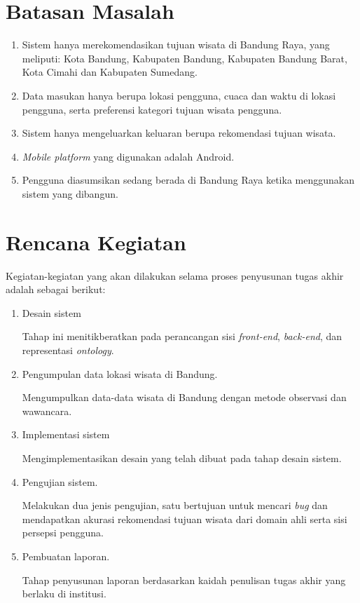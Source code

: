 \section{Batasan Masalah}
\begin{enumerate}
	\item Sistem hanya merekomendasikan tujuan wisata di Bandung Raya, yang meliputi: Kota Bandung, Kabupaten Bandung, Kabupaten Bandung Barat, Kota Cimahi dan Kabupaten Sumedang.
	\item Data masukan hanya berupa lokasi pengguna, cuaca  dan waktu di lokasi pengguna, serta preferensi kategori tujuan wisata pengguna.
	\item Sistem hanya mengeluarkan keluaran berupa rekomendasi tujuan wisata.
	\item \textit{Mobile platform} yang digunakan adalah Android.
	\item Pengguna diasumsikan sedang berada di Bandung Raya ketika menggunakan sistem yang dibangun. 
\end{enumerate}

\section{Rencana Kegiatan}
Kegiatan-kegiatan yang akan dilakukan selama proses penyusunan tugas akhir adalah sebagai berikut:
\begin{enumerate}
	\item Desain sistem
	\par
	Tahap ini menitikberatkan pada perancangan sisi \textit{front-end}, \textit{back-end}, dan representasi \textit{ontology}.
	\item Pengumpulan data lokasi wisata di Bandung.
	\par
	Mengumpulkan data-data wisata di Bandung dengan metode observasi dan wawancara.
	\item Implementasi sistem
	\par
	Mengimplementasikan desain yang telah dibuat pada tahap desain sistem.
	\item Pengujian sistem.
	\par
	Melakukan dua jenis pengujian, satu bertujuan untuk mencari \textit{bug} dan mendapatkan akurasi rekomendasi tujuan wisata dari domain ahli serta sisi 
	persepsi pengguna. 
	\item Pembuatan laporan.
	\par
	Tahap penyusunan laporan berdasarkan kaidah penulisan tugas akhir yang berlaku di institusi.
\end{enumerate}
